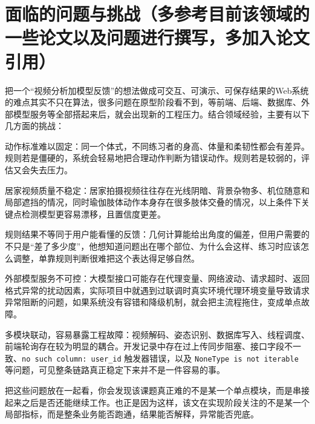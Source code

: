\section{面临的问题与挑战（多参考目前该领域的一些论文以及问题进行撰写，多加入论文引用）}
把一个“视频分析加模型反馈”的想法做成可交互、可演示、可保存结果的Web系统的难点其实不只在算法，很多问题在原型阶段看不到，等前端、后端、数据库、外部模型服务等全部搭起来后，就会出现新的工程压力。结合领域经验，主要有以下几方面的挑战：
\begin{chineseenum}
  \item 动作标准难以固定：同一个体式，不同练习者的身高、体量和柔韧性都会有差异。规则若是僵硬的，系统会轻易地把合理动作判断为错误动作。规则若是较弱的，评估又会失去压力。
  \item 居家视频质量不稳定：居家拍摄视频往往存在光线阴暗、背景杂物多、机位随意和局部遮挡的情况，同时瑜伽肢体动作本身存在很多肢体交叠的情况，以上条件下关键点检测模型更容易漂移，且置信度更差。
  \item 规则结果不等同于用户能看懂的反馈：几何计算能给出角度的偏差，但用户需要的不只是“差了多少度”，他想知道问题出在哪个部位、为什么会这样、练习时应该怎么调整，单靠规则判断很难把这个表达得足够自然。
  \item 外部模型服务不可控：大模型接口可能存在代理变量、网络波动、请求超时、返回格式异常的扰动因素，实际项目中就遇到过联调时真实环境代理环境变量导致请求异常阻断的问题，如果系统没有容错和降级机制，就会把主流程拖住，变成单点故障。
  \item 多模块联动，容易暴露工程故障：视频解码、姿态识别、数据库写入、线程调度、前端轮询存在较为明显的耦合。开发记录中存在过上传同步阻塞、接口字段不一致、\texttt{no such column: user\_id} 触发器错误，以及 \texttt{NoneType is not iterable} 等问题，可见整条链路真正稳定下来并不是一件容易的事。
\end{chineseenum}

把这些问题放在一起看，你会发现该课题真正难的不是某一个单点模块，而是串接起来之后是否还能继续工作。也正是因为这样，该文在实现阶段关注的不是某一个局部指标，而是整条业务能否跑通，结果能否解释，异常能否兜底。

